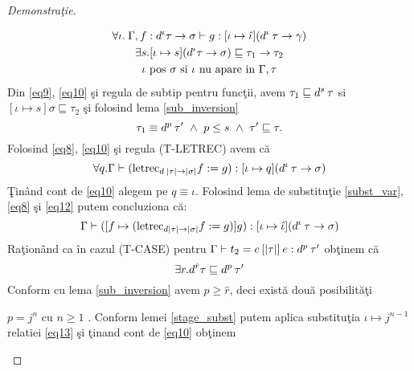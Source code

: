 \begin{proof}[Demonstra\c tie]
\begin{description}
\begin{enumerate*}
            \begin{gather}
                \label{eq8} \forall \iota. \:\Gamma,f : d^{{\iota}} \tau \to \sigma \vdash g : [\iota \mapsto \hat{\iota}] (d^{{\iota}}\hspace{2pt} \tau \to \gamma) \\
                \label{eq9} \exists s. [\iota \mapsto s] (d^{{\iota}} \tau \to \sigma) \sqsubseteq \tau_1 \to \tau_2 \\
                \label{eq10} \iota \text{ {pos} } \sigma \text{ {si} } \iota \text{ {nu apare in} } \Gamma , \tau
            \end{gather}
            Din \eqref{eq9}, \eqref{eq10} \c si regula de subtip pentru func\c tii, avem $\tau_1 \sqsubseteq d^{s} \hspace{2pt} \tau$ si $[\iota \mapsto s]\sigma \sqsubseteq \tau_2$ \c si folosind  lema \ref{sub_inversion}
            \begin{equation}\label{eq11}
              \tau_1 \equiv d^p\app \tau' \ \wedge \ p \le s \ \wedge\ \tau' \sqsubseteq \tau.
            \end{equation}
            Folosind \eqref{eq8}, \eqref{eq10} \c si regula {\scriptsize (T-LETREC)} avem c\u a
            \begin{equation}\label{eq12}
                \forall q. \Gamma \vdash (\text{letrec}_{d\hspace{2pt}|\tau| \to |\sigma|}f := g) : [\iota \mapsto q] (d^{{\iota}}\hspace{2pt}\tau \to \sigma)
            \end{equation}
            \c Tin\^ and cont de \eqref{eq10} alegem pe $q \equiv \iota$. Folosind lema de substitu\c tie \ref{subst_var}, \eqref{eq8} \c si \eqref{eq12} putem concluziona c\u a:
            \begin{equation}\label{eq13}
                \Gamma \vdash ([f \mapsto (\text{letrec}_{d|\tau| \to |\sigma|}f := g)]g) : [\iota \mapsto \hat {\iota}] (d^{\iota} \hspace{2pt} \tau \to \sigma)
            \end{equation}
            Ra\c tion\^ and ca \^ in cazul {\scriptsize (T-CASE)} pentru $\Gamma \vdash t_2 = c\hspace{2pt} [|\tau|] \hspace{2pt} e : d^p \hspace{2pt}\tau'$ ob\c tinem c\u a \done{}
            \begin{equation}\label{eq14}
                \exists r.  d^{\hat{r}} \tau \sqsubseteq d^p \hspace{2pt} \tau'
            \end{equation}
            Conform cu lema \ref{sub_inversion} avem $p \ge \hat{r}$, deci exist\u a dou\u a posibilit\u a\c ti
            \begin{enumerate*}
                \item $p=j^n$ cu $n \ge 1$ . Conform lemei \done{} \ref{stage_subst} putem aplica substitu\c tia $\iota \mapsto j^{n-1}$ relatiei \eqref{eq13} \c si \c tinand cont de \eqref{eq10} ob\c tinem

\end{enumerate*}
\end{enumerate*}
\end{description}
\end{proof}
